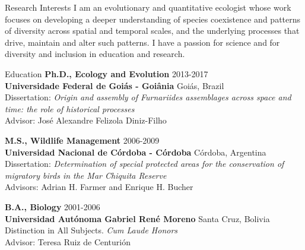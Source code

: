 \documentclass{resume} %
\begin{document}
\begin{rSection}{Research Interests}
I am an evolutionary and quantitative ecologist whose work focuses on developing a deeper understanding of species coexistence and patterns of diversity across spatial and temporal scales, and the underlying processes that drive, maintain and alter such patterns. I have a passion for science and for diversity and inclusion in education and research.
\end{rSection}


\begin{rSection}{Education}
{\bf Ph.D., Ecology and Evolution} \hfill 2013-2017 \\ 
{\bf Universidade Federal de Goiás - Goiânia} \hfill Goiás, Brazil \\
{Dissertation: \emph{Origin and assembly of Furnariides assemblages across space and time: the role of historical processes}} \\
{Advisor: José Alexandre Felizola Diniz-Filho} \smallskip 

{\bf M.S., Wildlife Management} \hfill 2006-2009 \\
{\bf Universidad Nacional de Córdoba - Córdoba} \hfill Córdoba, Argentina \\
{Dissertation: \emph{Determination of special protected areas for the conservation of migratory birds in the Mar Chiquita Reserve}} \\
{Advisors: Adrian H. Farmer and Enrique H. Bucher}\smallskip 

{\bf B.A., Biology} \hfill 2001-2006 \\
{\bf Universidad Autónoma Gabriel René Moreno} \hfill Santa Cruz, Bolivia \\
{Distinction in All Subjects. \emph{Cum Laude Honors}} \\ 
{Advisor: Teresa Ruiz de Centurión}\smallskip 
\end{rSection}

\end{document}
